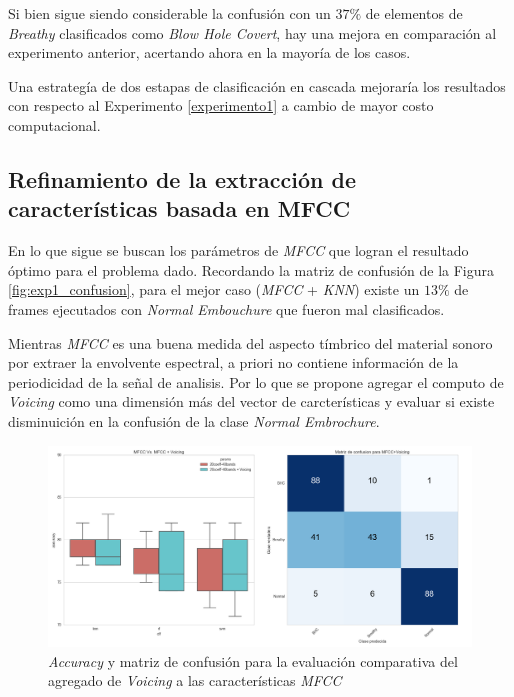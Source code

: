 \documentclass{article}
\begin{document}
Si bien sigue siendo considerable la confusión con un $37\%$ de elementos de \textit{Breathy} clasificados como \textit{Blow Hole Covert}, hay una mejora en comparación al experimento anterior, acertando ahora en la mayoría de los casos. 
\medskip 

Una estrategía de dos estapas de clasificación en cascada mejoraría los resultados con respecto al Experimento \ref{experimento1} a cambio de mayor costo computacional.

\subsection{Refinamiento de la extracción de características basada en MFCC}

En lo que sigue se buscan los parámetros de \textit{MFCC} que logran el resultado óptimo para el problema dado. Recordando la matriz de confusión de la Figura \ref{fig:exp1_confusion}, para el mejor caso (\textit{MFCC} + \textit{KNN}) existe un $13\%$ de frames ejecutados con \textit{Normal Embouchure} que fueron mal clasificados.
\medskip

Mientras \textit{MFCC} es una buena medida del aspecto tímbrico del material sonoro por extraer la envolvente espectral, a priori no contiene información de la periodicidad de la señal de analisis. Por lo que se propone agregar el computo de \textit{Voicing} como una dimensión más del vector de carcterísticas y evaluar si existe disminuición en la confusión de la clase \textit{Normal Embrochure}.
\medskip

\begin{figure}[H]
\begin{center}
\includegraphics[width=1\textwidth]{exp3} 
\caption{\textit{Accuracy} y matriz de confusión para la evaluación comparativa del agregado de \textit{Voicing} a las características \textit{MFCC}}
\label{fig:exp3}
\end{center}
\end{figure}
\end{document}
